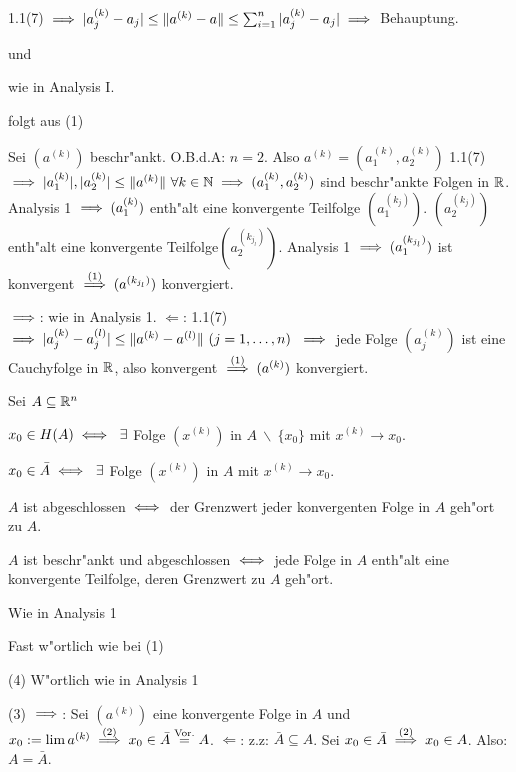 \documentclass[a4paper,twoside,DIV15,BCOR12mm]{scrbook}
\begin{document}
\begin{beweise}
  \item 1.1(7) $\implies |a_j^{(k)} - a_j| \le \|a^{(k)}-a\| \le \sum_{i=1}^n|a_j^{(k)} - a_j| \implies $ Behauptung.
  \item und
  \item wie in Analysis I.
  \item folgt aus (1)
  \item Sei $(a^{(k)})$ beschr"ankt. O.B.d.A: $n=2$. Also $a^{(k)}=(a_1^{(k)},a_2^{(k)})$ 1.1(7) $\implies |a_1^{(k)}|,|a_2^{(k)}|\le\|a^{(k)}\|\ \forall k\in\mathbb{N} \implies (a_1^{(k)},a_2^{(k)})$ sind beschr"ankte Folgen in $\mathbb{R}$. Analysis 1 $\implies (a_1^{(k)})$ enth"alt eine konvergente Teilfolge $(a_1^{(k_j)})$. $(a_2^{(k_j)})$ enth"alt eine konvergente Teilfolge$ (a_2^{(k_{j_l})})$. Analysis 1 $\implies (a_1^{(k_{j_l})})$ ist konvergent $\overset{(1)}{\implies} (a^{(k_{j_l})})$ konvergiert.
  \item \glqq$\implies$\grqq: wie in Analysis 1. \glqq$\Leftarrow$\grqq: 1.1(7) $\implies |a_j^{(k)}-a_j^{(l)}| \le \|a^{(k)}-a^{(l)}\|\ (j=1,\ldots,n)\ \implies$ jede Folge $(a_j^{(k)})$ ist eine Cauchyfolge in $\mathbb{R}$, also konvergent $\overset{(1)}{\implies} (a^{(k)})$ konvergiert.
\end{beweise}

\begin{satz}
Sei $A\subseteq\mathbb{R}^n$
\begin{liste}
\item $x_0 \in H(A)\iff\ \exists$ Folge $(x^{(k)})$ in $A\ \backslash\ \{x_0\}$ mit $x^{(k)}\to x_0$.
\item $x_0 \in \bar A\iff\ \exists$ Folge $(x^{(k)})$ in $A$ mit $x^{(k)}\to x_0$.
\item $A$ ist abgeschlossen $\iff$ der Grenzwert jeder konvergenten Folge in $A$ geh"ort zu $A$.
\item $A$ ist beschr"ankt und abgeschlossen $\iff$ jede Folge in $A$ enth"alt eine konvergente Teilfolge, deren Grenzwert zu $A$ geh"ort.
\end{liste}
\end{satz}

\begin{beweise}
\item Wie in Analysis 1
\item Fast w"ortlich wie bei (1)
\item[(4)] W"ortlich wie in Analysis 1
\item[(3)] \glqq$\implies$\grqq: Sei $(a^{(k)})$ eine konvergente Folge in $A$ und $x_0:=\lim a^{(k)} \overset{(2)}{\implies} x_0 \in \bar A \overset{\text{Vor.}}{=}A$. \glqq$\Leftarrow$\grqq: z.z: $\bar A \subseteq A$. Sei $x_0 \in \bar A \overset{(2)}{\implies}x_0 \in A$. Also: $A=\bar A$.
\end{beweise}
\end{document}
